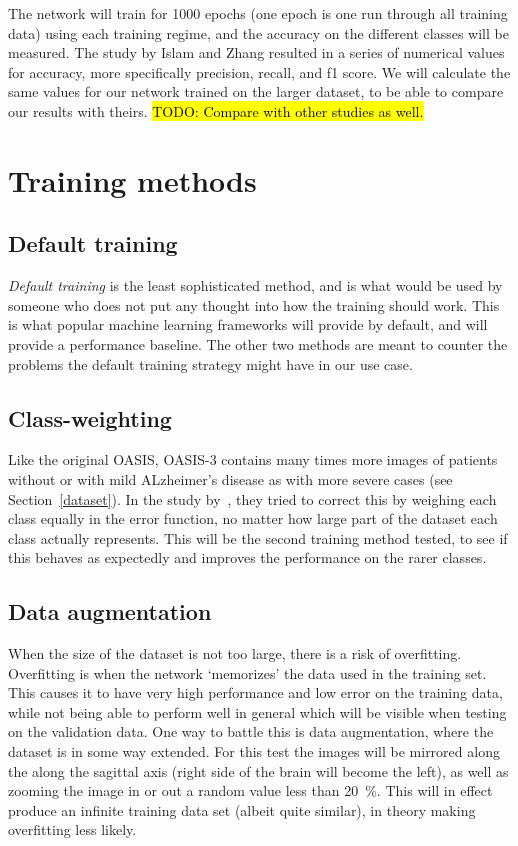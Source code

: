 \documentclass{kththesis}
\newcommand{\num}[1]{{#1}}
\begin{document}
The network will train for \num{1000} epochs (one epoch is one run through all training data) using each training regime, and the accuracy on the different classes will be measured. The study by Islam and Zhang resulted in a series of numerical values for accuracy, more specifically precision, recall, and f1 score. We will calculate the same values for our network trained on the larger dataset, to be able to compare our results with theirs. \hl{TODO: Compare with other studies as well.}

\section{Training methods}
\subsection{Default training}
\textit{Default training} is the least sophisticated method, and is what would be used by someone who does not put any thought into how the training should work. This is what popular machine learning frameworks will provide by default, and will provide a performance baseline. The other two methods are meant to counter the problems the default training strategy might have in our use case.

\subsection{Class-weighting}
Like the original OASIS, OASIS-3 contains many times more images of patients without or with mild ALzheimer's disease as with more severe cases (see Section~\ref{dataset}). In the study by~\textcite{islam2017novel}, they tried to correct this by weighing each class equally in the error function, no matter how large part of the dataset each class actually represents. This will be the second training method tested, to see if this behaves as expectedly and improves the performance on the rarer classes.

\subsection{Data augmentation}
When the size of the dataset is not too large, there is a risk of overfitting. Overfitting is when the network `memorizes' the data used in the training set. This causes it to have very high performance and low error on the training data, while not being able to perform well in general which will be visible when testing on the validation data. One way to battle this is data augmentation, where the dataset is in some way extended. For this test the images will be mirrored along the along the sagittal axis (right side of the brain will become the left), as well as zooming the image in or out a random value less than 20~\%. This will in effect produce an infinite training data set (albeit quite similar), in theory making overfitting less likely.
\end{document}
